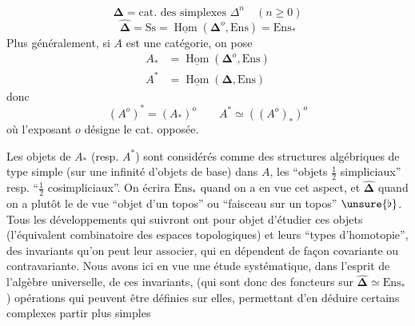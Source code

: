 \[
\boldsymbol\Delta=\text{cat. des simplexes }\Delta^n\quad(n\geq0)
\]
\[
\widehat{\boldsymbol\Delta}=\mathrm{Ss}=\underline{\operatorname{Hom}}(\boldsymbol\Delta^o,\mathrm{Ens})=\mathrm{Ens}_*
\]
Plus généralement, si $A$ est une catégorie, on pose
\[
\begin{aligned}
A_*&=\underline{\operatorname{Hom}}(\boldsymbol\Delta^o,\mathrm{Ens})\\
A^*&=\underline{\operatorname{Hom}}(\boldsymbol\Delta,\mathrm{Ens})
\end{aligned}
\]
donc
\[ (A^o)^*=(A_*)^o\qquad A^*\simeq((A^o)_*)^o \]
où l'exposant $o$ désigne le  cat. opposée.

Les objets de $A_*$ (resp. $A^*$) sont considérés comme des structures algébriques de type simple (sur une infinité d'objets de base) dans $A$, les ``objets $\tfrac12$ simpliciaux'' resp. ``$\tfrac12$ cosimpliciaux''. On écrira $\mathrm{Ens}_*$ quand on a en vue cet aspect, et $\widehat{\boldsymbol\Delta}$  quand on a plutôt le  de vue ``objet d'un topos'' ou ``faisceau sur un topos'' $\unsure{\flat}$. Tous les développements qui suivront ont pour objet d'étudier ces objets (l'équivalent combinatoire des espaces topologiques) et leurs ``types d'homotopie'',  des invariants qu'on peut leur associer, qui en dépendent de façon covariante ou contravariante. Nous avons ici en vue une étude systématique, dans l'esprit de l'algèbre universelle, de ces invariants, (qui sont donc des foncteurs sur $\widehat{\boldsymbol\Delta}\simeq\mathrm{Ens}_*$)   opérations qui peuvent être définies sur elles, permettant d'en déduire certains complexes  partir  plus simples

